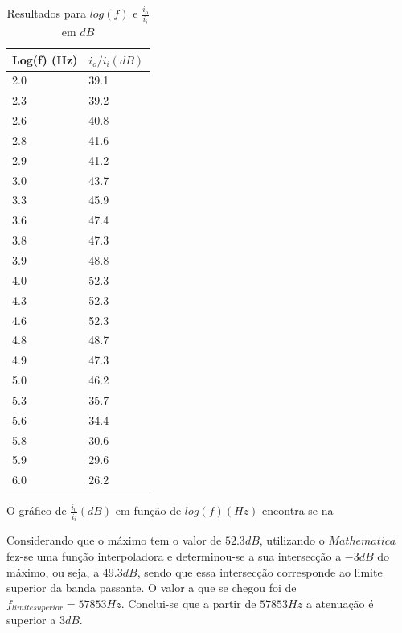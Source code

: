 \documentclass[%
  reprint,
  nofootinbib,
  amsmath,amssymb,
  aps,
  10pt,
  a4paper
]{revtex4-1}
\begin{document}
{\begin{table}
    \begin{tabular}{|l|l|}
    \hline
    Log(f) (Hz) & $ i_o/i_i (dB)$ \\ \hline
    2.0         & 39.1           \\ \hline
    2.3         & 39.2           \\ \hline
    2.6         & 40.8           \\ \hline
    2.8         & 41.6           \\ \hline
    2.9         & 41.2           \\ \hline
    3.0         & 43.7           \\ \hline
    3.3         & 45.9           \\ \hline
    3.6         & 47.4           \\ \hline
    3.8         & 47.3           \\ \hline
    3.9         & 48.8           \\ \hline
    4.0         & 52.3           \\ \hline
    4.3         & 52.3           \\ \hline
    4.6         & 52.3           \\ \hline
    4.8         & 48.7           \\ \hline
    4.9         & 47.3           \\ \hline
    5.0         & 46.2           \\ \hline
    5.3         & 35.7           \\ \hline
    5.6         & 34.4           \\ \hline
    5.8         & 30.6           \\ \hline
    5.9         & 29.6           \\ \hline
    6.0         & 26.2           \\ \hline
    \end{tabular}
\caption{Resultados para $log(f)$ e $\frac{i_o}{i_i}$ em $dB$}
\label{tab:respostafrequenciaanalise}
\end{table}

O gráfico de $\frac{i_0}{i_i} (dB)$ em função de $log(f) (Hz)$ encontra-se na  


Considerando que o máximo tem o valor de $52.3 dB$, utilizando o $Mathematica$ fez-se uma função interpoladora e determinou-se a sua intersecção a $-3 dB$ do máximo, ou seja, a $49.3 dB$, sendo que essa intersecção corresponde ao limite superior da banda passante. O valor a que se chegou foi de $f_{limite superior}=57853Hz$. Conclui-se que a partir de $57853Hz$ a atenuação é superior a $3dB$.


}
\end{document}

